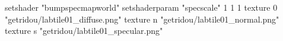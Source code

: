 setshader "bumpspecmapworld"
setshaderparam "specscale" 1 1 1
   texture 0 "getridou/labtile01_diffuse.png"
   texture n "getridou/labtile01_normal.png"
   texture s "getridou/labtile01_specular.png"
